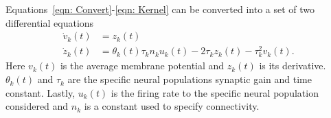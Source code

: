 Equations~\ref{eqn: Convert}-\ref{eqn: Kernel} can be converted into a set of two differential equations \begin{align}%
\label{eqn: FR2PSP1}
\dot{v}_{k}(t)&= z_{k}(t)\\
\label{eqn: FR2PSP2}
\dot{z}_{k}(t)&=\theta_{k}(t)\tau_{k}n_{k}u_{k}(t)-2\tau_{k}z_{k}(t)-\tau_{k}^{2}v_{k}(t).
\end{align} Here $v_{k}(t)$ is the average membrane potential and $z_{k}(t)$ is its derivative. $\theta_{k}(t)$ and $\tau_{k}$ are the specific neural populations synaptic gain and time constant. Lastly, $u_{k}(t)$ is the firing rate to the specific neural population considered and $n_{k}$ is a constant used to specify connectivity.

